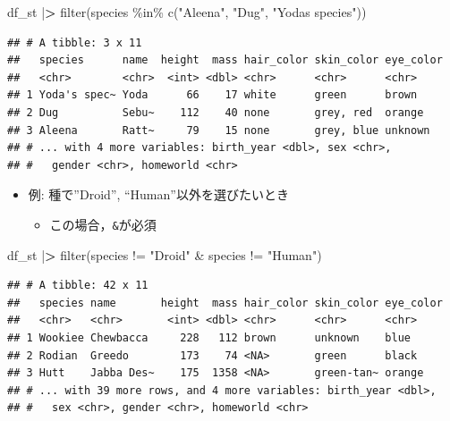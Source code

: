 \documentclass[
  xelatex,ja=standard, b5paper]{bxjsbook}
\newenvironment{Shaded}{\begin{snugshade}}{\end{snugshade}}
\newcommand{\ErrorTok}[1]{\textcolor[rgb]{0.64,0.00,0.00}{\textbf{#1}}}
\newcommand{\FunctionTok}[1]{\textcolor[rgb]{0.00,0.00,0.00}{#1}}
\newcommand{\NormalTok}[1]{#1}
\newcommand{\SpecialCharTok}[1]{\textcolor[rgb]{0.00,0.00,0.00}{#1}}
\newcommand{\StringTok}[1]{\textcolor[rgb]{0.31,0.60,0.02}{#1}}
\providecommand{\tightlist}{%
  \setlength{\itemsep}{0pt}\setlength{\parskip}{0pt}}
\begin{document}
\begin{Shaded}
\begin{Highlighting}[]
\NormalTok{df\_st }\SpecialCharTok{|}\ErrorTok{\textgreater{}} 
  \FunctionTok{filter}\NormalTok{(species }\SpecialCharTok{\%in\%} \FunctionTok{c}\NormalTok{(}\StringTok{"Aleena"}\NormalTok{, }\StringTok{"Dug"}\NormalTok{, }\StringTok{"Yoda\textquotesingle{}s species"}\NormalTok{))}
\end{Highlighting}
\end{Shaded}

\begin{verbatim}
## # A tibble: 3 x 11
##   species      name  height  mass hair_color skin_color eye_color
##   <chr>        <chr>  <int> <dbl> <chr>      <chr>      <chr>    
## 1 Yoda's spec~ Yoda      66    17 white      green      brown    
## 2 Dug          Sebu~    112    40 none       grey, red  orange   
## 3 Aleena       Ratt~     79    15 none       grey, blue unknown  
## # ... with 4 more variables: birth_year <dbl>, sex <chr>,
## #   gender <chr>, homeworld <chr>
\end{verbatim}

\begin{itemize}
\tightlist
\item
  例: 種で''Droid'', ``Human''以外を選びたいとき

  \begin{itemize}
  \tightlist
  \item
    この場合，\texttt{\&}が必須
  \end{itemize}
\end{itemize}

\begin{Shaded}
\begin{Highlighting}[]
\NormalTok{df\_st }\SpecialCharTok{|}\ErrorTok{\textgreater{}} 
  \FunctionTok{filter}\NormalTok{(species }\SpecialCharTok{!=} \StringTok{"Droid"} \SpecialCharTok{\&}\NormalTok{ species }\SpecialCharTok{!=} \StringTok{"Human"}\NormalTok{)}
\end{Highlighting}
\end{Shaded}

\begin{verbatim}
## # A tibble: 42 x 11
##   species name       height  mass hair_color skin_color eye_color
##   <chr>   <chr>       <int> <dbl> <chr>      <chr>      <chr>    
## 1 Wookiee Chewbacca     228   112 brown      unknown    blue     
## 2 Rodian  Greedo        173    74 <NA>       green      black    
## 3 Hutt    Jabba Des~    175  1358 <NA>       green-tan~ orange   
## # ... with 39 more rows, and 4 more variables: birth_year <dbl>,
## #   sex <chr>, gender <chr>, homeworld <chr>
\end{verbatim}
\end{document}
